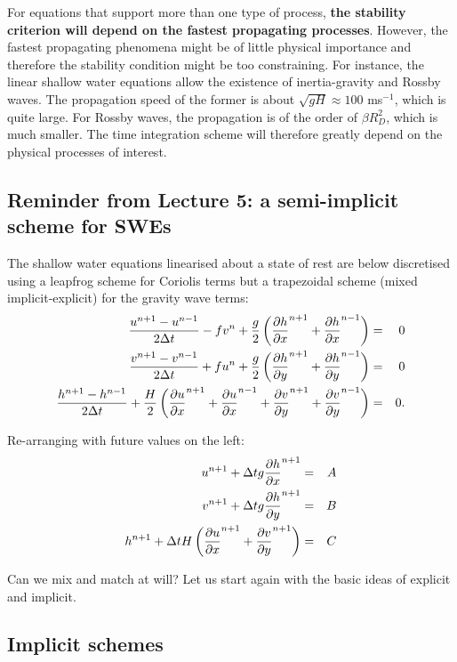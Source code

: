 \vspace{0.2cm}For equations that support more than one type of process, {\bf the stability criterion will depend on the fastest propagating processes}. However, the fastest propagating phenomena might be of little physical importance and therefore the stability condition might be too constraining. For instance, the linear shallow water equations allow the existence of inertia-gravity and Rossby waves. The propagation speed of the former is about $\sqrt{gH} \approx 100 $ ms$^{-1}$, which is quite large. For Rossby waves, the propagation is of the order of $\beta R_D^2$, which is much smaller. The time integration scheme will therefore greatly depend on the physical processes of interest. 

\hspace{2cm}


\subsection{Reminder from Lecture 5: a semi-implicit scheme for SWEs}

The shallow water equations linearised about a state of rest are below
discretised using a leapfrog scheme for Coriolis terms but a
trapezoidal scheme (mixed implicit-explicit) for the gravity wave
terms:
\begin{eqnarray*}
	\frac{u^{n+1}-u^{n-1}}{2\Delta t}-fv^n+\frac{g}{2}
	\left( \frac{\partial h}{\partial x}^{n+1} +\frac{\partial h}{\partial x}^{n-1} \right) & = & 0 \\
	\frac{v^{n+1}-v^{n-1}}{2\Delta t}+fu^n+\frac{g}{2}
	\left( \frac{\partial h}{\partial y}^{n+1} +\frac{\partial h}{\partial y}^{n-1} \right) & = & 0 \\
	\frac{h^{n+1}-h^{n-1}}{2\Delta t}+\frac{H}{2}
	\left( \frac{\partial u}{\partial x}^{n+1} +\frac{\partial u}{\partial x}^{n-1}
	+\frac{\partial v}{\partial y}^{n+1} +\frac{\partial v}{\partial y}^{n-1} 
	\right) & = & 0. 
\end{eqnarray*}

Re-arranging with future values on the left:
\begin{eqnarray*}
	u^{n+1}+\Delta t g \frac{\partial h}{\partial x}^{n+1} & = & A \\
	v^{n+1}+\Delta t g \frac{\partial h}{\partial y}^{n+1} & = & B \\
	h^{n+1}+\Delta t H \left( \frac{\partial u}{\partial x}^{n+1}+\frac{\partial v}{\partial y}^{n+1} \right) & = & C
\end{eqnarray*}

Can we mix and match at will? Let us start again with the basic ideas of explicit and implicit.


\subsection{Implicit schemes}

